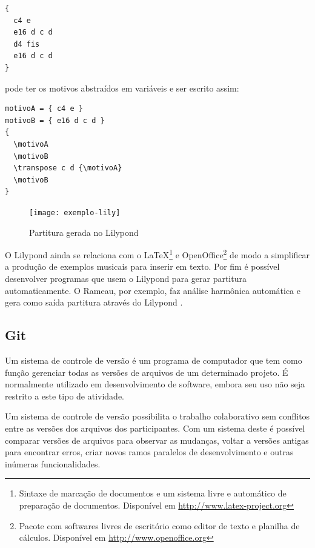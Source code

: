 \singlespacing
\begin{verbatim}
{
  c4 e
  e16 d c d
  d4 fis
  e16 d c d
}
\end{verbatim}
\doublespacing

pode ter os motivos abstraídos em variáveis e ser escrito assim:

\singlespacing
\begin{verbatim}
motivoA = { c4 e }
motivoB = { e16 d c d }
{
  \motivoA
  \motivoB
  \transpose c d {\motivoA}
  \motivoB
}
\end{verbatim}
\doublespacing

\begin{figure}[!h]
  \centering
  \texttt{[image: exemplo-lily]}
  \caption{Partitura gerada no Lilypond}
  \label{fig:exemplo-lily}
\end{figure}

O Lilypond ainda se relaciona com o \LaTeX{}\footnote{Sintaxe de
  marcação de documentos e um sistema livre e automático de preparação
  de documentos. Disponível em \url{http://www.latex-project.org}} e
OpenOffice\footnote{Pacote com softwares livres de escritório como
  editor de texto e planilha de cálculos. Disponível em
  \url{http://www.openoffice.org}} de modo a simplificar a produção de
exemplos musicais para inserir em texto. Por fim é possível
desenvolver programas que usem o Lilypond para gerar partitura
automaticamente. O Rameau, por exemplo, faz análise harmônica
automática e gera como saída partitura através do Lilypond
\cite{kroger08:rameau}.

\subsection{Git}
\label{sec:git}

Um sistema de controle de versão é um programa de computador que tem
como função gerenciar todas as versões de arquivos de um determinado
projeto. É normalmente utilizado em desenvolvimento de software,
embora seu uso não seja restrito a este tipo de atividade.

Um sistema de controle de versão possibilita o trabalho colaborativo
sem conflitos entre as versões dos arquivos dos participantes. Com um
sistema deste é possível comparar versões de arquivos para observar as
mudanças, voltar a versões antigas para encontrar erros, criar novos
ramos paralelos de desenvolvimento e outras inúmeras funcionalidades.

